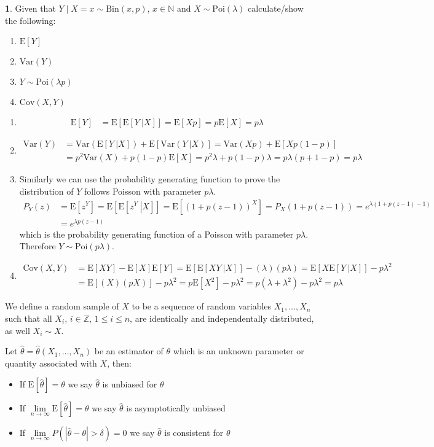 \documentclass[english,12pt]{article}
\theoremstyle{plain}
\theoremstyle{definition}
\newtheorem*{example}{\protect\examplename}
\theoremstyle{definition} %
\providecommand{\examplename}{Example}
\newcommand{\enum}[1]{\begin{enumerate} #1 \end{enumerate}}
\newcommand{\ex}[1]{\mbox{E} \left[ #1 \right]}
\newcommand{\var}[1]{\mbox{Var} \left( #1 \right)}
\newcommand{\cov}[1]{\mbox{Cov} \left( #1 \right)}
\newcommand{\condex}[2]{\mbox{E} \left[ \left. #1 \ \right\vert \left. #2 \right. \right]}
\newcommand{\condvar}[2]{\mbox{Var} \left( \left. #1 \ \right\lvert \left. #2 \right. \right)}
\begin{document}
\begin{example}
Given that $Y\mid X=x\sim \text{Bin}(x,p)$, $x\in\mathbb{N}$ and $X\sim \text{Poi}(\lambda)$ calculate/show the following:
\enum{
\item $\ex{Y}$
\item $\var{Y}$
\item $Y\sim \text{Poi}(\lambda p)$
\item $\cov{X,Y}$
}
\enum{
\item
\begin{align*}
\ex{Y}&=\ex{\condex{Y}{X}}
=\ex{Xp}
=p\ex{X}
=p\lambda
\end{align*}
\item
\begin{align*}
\var{Y}&=\var{\condex{Y}{X}}+\ex{\condvar{Y}{X}}
=\var{Xp}+\ex{Xp(1-p)}\\
&=p^2\var{X}+p(1-p)\ex{X}
=p^2\lambda+p(1-p)\lambda
=p\lambda(p+1-p)
=p\lambda
\end{align*}
\item
Similarly we can use the probability generating function to prove the distribution of $Y$ follows Poisson with parameter $p\lambda$.
\begin{align*}
P_Y(z)&=\ex{z^Y}
=\ex{\condex{z^Y}{X}}
=\ex{(1+p(z-1))^X}
=P_X(1+p(z-1))
=e^{\lambda(1+p(z-1)-1)}\\
&=e^{\lambda p(z-1)}
\end{align*}
which is the probability generating function of a Poisson with parameter $p\lambda$.  Therefore $Y\sim \text{Poi}(p\lambda)$.
\item
\begin{align*}
\cov{X,Y}&=\ex{XY}-\ex{X}\ex{Y}
=\ex{\condex{XY}{X}}-(\lambda)(p\lambda)
=\ex{X\condex{Y}{X}}-p\lambda^2\\
&=\ex{(X)(pX)}-p\lambda^2
=p\ex{X^2}-p\lambda^2
=p(\lambda+\lambda^2)-p\lambda^2
=p\lambda
\end{align*}
}
\end{example}

We define a random sample of $X$ to be a sequence of random variables $X_1,\ldots,X_n$ such that all $X_i$, $i\in\mathbb{Z}$, $1\le i\le n$, are identically and independentally distributed, as well $X_i\sim X$.

Let $\hat{\theta}=\hat{\theta}(X_1,\ldots,X_n)$ be an estimator of $\theta$ which is an unknown parameter or quantity associated with $X$, then:
\begin{itemize}
\item If $\ex{\hat\theta}=\theta$ we say $\hat\theta$ is unbiased for $\theta$
\item If $\lim\limits_{n\to\infty} \ex{\hat\theta}=\theta$ we say $\hat\theta$ is asymptotically unbiased
\item If $\lim\limits_{n\to\infty}P(|\hat\theta-\theta|>\delta)=0$ we say $\hat\theta$ is consistent for $\theta$
\end{itemize}
\end{document}
